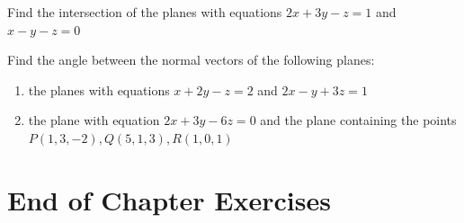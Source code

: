 \begin{exerciselist}
\begin{enumerate}[label=(\alph*)]
	\end{enumerate}
	\item Find the intersection of the planes with equations $2x+3y-z=1$ and $x-y-z=0$
	\item Find the angle between the normal vectors of the following planes: \begin{enumerate}[label=(\alph*)]
		\item the planes with equations $x+2y-z=2$ and $2x-y+3z=1$
		\item the plane with equation $2x+3y-6z=0$ and the plane containing the points $P(1,3,-2),Q(5,1,3),R(1,0,1)$
		\end{enumerate}
\end{exerciselist}

\section{End of Chapter Exercises}
